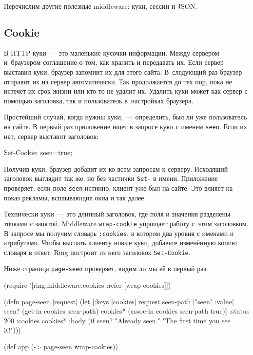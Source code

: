 Перечислим другие полезные middleware: куки, сессии и JSON.

\subsection{Cookie}


В HTTP куки~--- это маленькие кусочки информации. Между сервером и~браузером
соглашение о том, как хранить и передавать их. Если сервер выставил куки,
браузер запомнит их для этого сайта. В~следующий раз браузер отправит их на
сервер автоматически. Так продолжается до тех пор, пока не истечёт их срок
жизни или кто-то не удалит их. Удалить куки может как сервер с помощью
заголовка, так и пользователь в~настройках браузера.

Простейший случай, когда нужны куки,~--- определить, был ли уже пользователь на
сайте. В первый раз приложение ищет в запросе куки с именем
\verb|seen|. Если их нет, сервер выставит заголовок:

\begin{english}
  \begin{http}
Set-Cookie: seen=true;
  \end{http}
\end{english}

Получив куки, браузер добавит их ко всем запросам к серверу. Исходящий заголовок
выглядит так же, но без частички \verb|Set-| в имени. Приложение проверяет: если
поле \verb|seen| истинно, клиент уже был на сайте. Это влияет на показ рекламы,
всплывающие окна и так далее.

Технически куки~--- это длинный заголовок, где поля и значения разделены точками с
запятой. Middleware \verb|wrap-cookie| упрощает работу с~этим заголовком. В
запросе мы получим словарь \verb|:cookies|, в котором два уровня с именами и
атрибутами. Чтобы выслать клиенту новые куки, добавьте изменённую копию словаря
в ответ. Ring построит из него заголовок \verb|Set-Cookie|.

Ниже страница \verb|page-seen| проверяет, видим ли мы её в первый раз.


\ifnarrow

\begin{english}
  \begin{clojure/lines}
(require '[ring.middleware.cookies
           :refer [wrap-cookies]])

(defn page-seen [request]
  (let [{:keys [cookies]} request
        seen-path ["seen" :value]
        seen? (get-in cookies
                      seen-path)
        cookies* (assoc-in cookies
                   seen-path true)]
    {:status 200
     :cookies cookies*
     :body
     (if seen?
      "Already seen."
      "The first time you see it!")}))

(def app (-> page-seen
             wrap-cookies))
  \end{clojure/lines}
\end{english}

